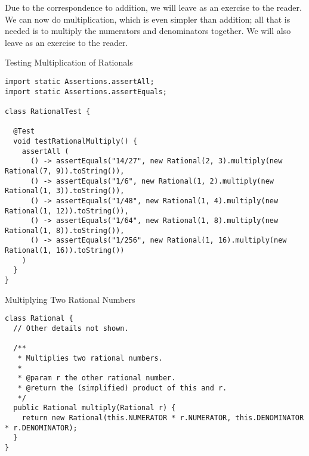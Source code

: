 Due to the correspondence to addition, we will leave  as an exercise to the reader. We can now do multiplication, which is even simpler than addition; all that is needed is to multiply the numerators and denominators together. We will also leave  as an exercise to the reader.

\begin{cl}{Testing Multiplication of Rationals}
\begin{lstlisting}[language=MyJava]
import static Assertions.assertAll;
import static Assertions.assertEquals;

class RationalTest {

  @Test
  void testRationalMultiply() {
    assertAll (
      () -> assertEquals("14/27", new Rational(2, 3).multiply(new Rational(7, 9)).toString()),
      () -> assertEquals("1/6", new Rational(1, 2).multiply(new Rational(1, 3)).toString()),
      () -> assertEquals("1/48", new Rational(1, 4).multiply(new Rational(1, 12)).toString()),
      () -> assertEquals("1/64", new Rational(1, 8).multiply(new Rational(1, 8)).toString()),
      () -> assertEquals("1/256", new Rational(1, 16).multiply(new Rational(1, 16)).toString())
    )
  }
}
\end{lstlisting}
\end{cl}

\begin{cl}{Multiplying Two Rational Numbers}
\begin{lstlisting}[language=MyJava]
class Rational {
  // Other details not shown.

  /**
   * Multiplies two rational numbers.
   *
   * @param r the other rational number.
   * @return the (simplified) product of this and r.
   */
  public Rational multiply(Rational r) {
    return new Rational(this.NUMERATOR * r.NUMERATOR, this.DENOMINATOR * r.DENOMINATOR);
  }
}
\end{lstlisting}
\end{cl}